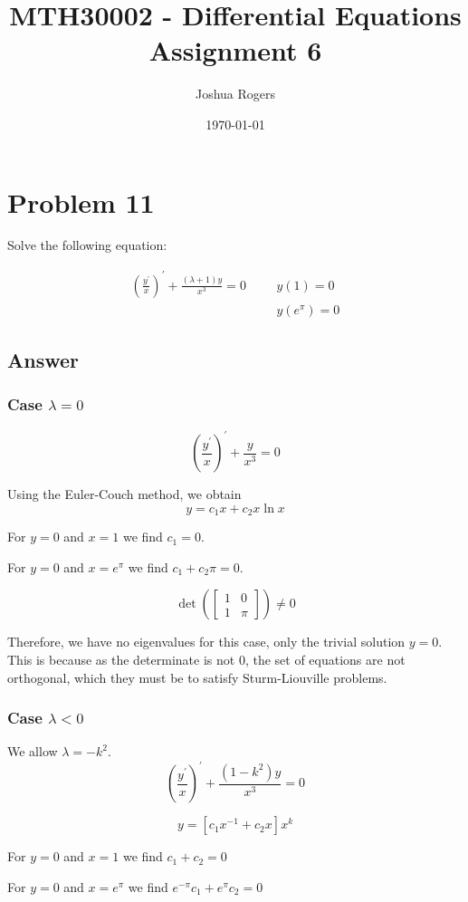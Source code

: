 \documentclass{article}
\title{\vspace{-4cm}MTH30002 - Differential Equations \\Assignment 6}
\author{Joshua Rogers}
\date\today
\begin{document}
\maketitle

\section*{Problem 11}

Solve the following equation:

\begin{align}\label{11}
\left(\frac{y^{'}}{x}\right)^{'} + \frac{\left(\lambda + 1\right)y}{x^3} = 0 && &y(1) =0 \\
&& &y(e^\pi)=0 \nonumber
\end{align}
\subsection*{Answer}

\subsubsection*{Case $\lambda=0$}
$$ \left(\frac{y^{'}}{x}\right)^{'} + \frac{y}{x^3} = 0 $$

Using the Euler-Couch method, we obtain
$$y = c_1 x + c_2 x \ln x$$

For $y=0$ and $x=1$ we find $c_1 = 0$.

For $y=0$ and $x=e^\pi$ we find $c_1+c_2\pi=0$.

$$\det \left( \begin{bmatrix} 1 & 0 \\ 1 & \pi \end{bmatrix} \right) \neq 0$$

Therefore, we have no eigenvalues for this case, only the trivial solution $y=0$. This is because as the determinate is not 0, the set of equations are not orthogonal, which they must be to satisfy Sturm-Liouville problems.

\subsubsection*{Case $\lambda < 0$}
We allow $\lambda = -k^2$.
$$\left(\frac{y^{'}}{x}\right)^{'} + \frac{\left(1-k^2 \right)y}{x^3} = 0$$

$$y = \left[c_1x^{-1}+c_2x\right]x^k$$

For $y=0$ and $x=1$ we find $c_1+c_2=0$

For $y=0$ and $x=e^\pi$ we find $e^{-\pi}c_1 + e^{\pi}c_2 = 0$
\end{document}
